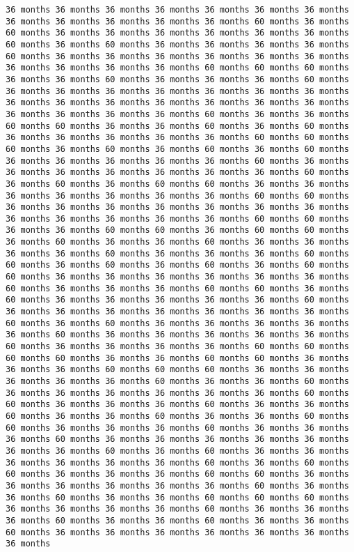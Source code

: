 \documentclass[11pt]{article}
\begin{document}
\begin{Verbatim}[commandchars=\\\{\}, frame=single, framerule=2mm, rulecolor=\color{outerrorbackground}]
36 months 36 months 36 months 36 months 36 months 36 months 36 months 36 months 36 months 36 months 36 months 36 months 60 months 36 months 60 months 36 months 36 months 36 months 36 months 36 months 36 months 60 months 36 months 60 months 36 months 36 months 36 months 36 months 60 months 36 months 36 months 36 months 36 months 36 months 36 months 36 months 36 months 36 months 36 months 60 months 60 months 60 months 36 months 36 months 60 months 36 months 36 months 36 months 60 months 36 months 36 months 36 months 36 months 36 months 36 months 36 months 36 months 36 months 36 months 36 months 36 months 36 months 36 months 36 months 36 months 36 months 36 months 60 months 36 months 36 months 60 months 60 months 36 months 36 months 60 months 36 months 60 months 36 months 36 months 36 months 36 months 36 months 60 months 60 months 60 months 36 months 60 months 36 months 60 months 36 months 60 months 36 months 36 months 36 months 36 months 36 months 60 months 36 months 36 months 36 months 36 months 36 months 36 months 36 months 60 months 36 months 60 months 36 months 60 months 60 months 36 months 36 months 36 months 36 months 36 months 36 months 36 months 60 months 60 months 36 months 36 months 36 months 36 months 36 months 36 months 36 months 36 months 36 months 36 months 36 months 36 months 60 months 60 months 36 months 36 months 60 months 60 months 36 months 60 months 60 months 36 months 60 months 36 months 36 months 60 months 36 months 36 months 36 months 36 months 60 months 36 months 36 months 36 months 60 months 60 months 36 months 60 months 36 months 60 months 36 months 60 months 60 months 36 months 36 months 36 months 36 months 36 months 36 months 60 months 36 months 36 months 36 months 60 months 60 months 36 months 60 months 36 months 36 months 36 months 36 months 36 months 60 months 36 months 36 months 36 months 36 months 36 months 36 months 36 months 60 months 36 months 60 months 36 months 36 months 36 months 36 months 36 months 60 months 36 months 36 months 36 months 36 months 36 months 60 months 36 months 36 months 36 months 36 months 60 months 60 months 60 months 60 months 36 months 36 months 60 months 60 months 36 months 36 months 36 months 60 months 60 months 60 months 36 months 36 months 36 months 36 months 36 months 60 months 36 months 36 months 60 months 36 months 36 months 36 months 36 months 36 months 36 months 60 months 60 months 36 months 36 months 36 months 60 months 36 months 36 months 60 months 36 months 36 months 60 months 36 months 36 months 60 months 60 months 36 months 36 months 36 months 60 months 36 months 36 months 36 months 60 months 36 months 36 months 36 months 36 months 36 months 36 months 36 months 60 months 36 months 60 months 36 months 36 months 36 months 36 months 36 months 36 months 60 months 36 months 60 months 60 months 36 months 36 months 36 months 60 months 60 months 36 months 36 months 36 months 36 months 36 months 36 months 60 months 36 months 36 months 60 months 36 months 36 months 60 months 60 months 60 months 36 months 36 months 36 months 36 months 60 months 36 months 36 months 36 months 60 months 36 months 36 months 60 months 36 months 36 months 60 months 36 months 36 months 36 months 36 months 36 months 36 months 36 months 
\end{Verbatim}
\end{document}
